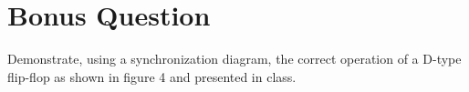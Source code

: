\documentclass[12pt, a4paper]{article}
\begin{document}
	\begin{center}
	\end{center}
	
	\section*{Bonus Question}
	Demonstrate, using a synchronization diagram, the correct operation of a D-type flip-ﬂop as shown in figure 4 and presented in class.
	\begin{center}
	\end{center}
	
\end{document}

